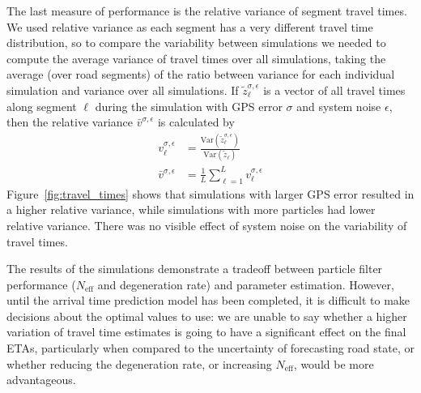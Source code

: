 

The last measure of performance is the relative variance of segment travel times.
We used relative variance as each segment has a very different travel time distribution,
so to compare the variability between simulations we needed to 
compute the average variance of travel times over all simulations,
taking the average (over road segments) of the ratio between variance for
each individual simulation and variance over all simulations.
If $\tilde z_\ell^{\sigma,\epsilon}$ is a vector of all travel times
along segment $\ell$ during the simulation with GPS error $\sigma$ and system noise $\epsilon$,
then the relative variance $\bar v^{\sigma,\epsilon}$ is calculated by
\begin{equation*}
\begin{split}
v_\ell^{\sigma,\epsilon} &=
\frac{\mathrm{Var}(\tilde z_\ell^{\sigma,\epsilon})}{\mathrm{Var}(\tilde z_\ell)} \\
\bar v^{\sigma,\epsilon} &=
    \frac{1}{L}\sum_{\ell=1}^L v_\ell^{\sigma,\epsilon}
\end{split}
\end{equation*}
Figure~\ref{fig:travel_times} shows that simulations with larger GPS error
resulted in a higher relative variance,
while simulations with more particles had lower relative variance.
There was no visible effect of system noise on the variability of travel times.


The results of the simulations
demonstrate a tradeoff between particle filter performance
($N_\text{eff}$ and degeneration rate) and parameter estimation.
However, until the arrival time prediction model has been completed,
it is difficult to make decisions about the optimal values to use:
we are unable to say whether a higher variation of travel time estimates
is going to have a significant effect on the final ETAs,
particularly when compared to the uncertainty of forecasting road state,
or whether reducing the degeneration rate, 
or increasing $N_\text{eff}$, would be more advantageous.


